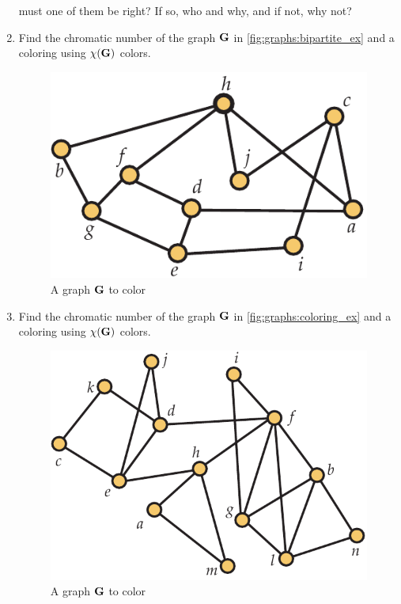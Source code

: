 \begin{enumerate}
  must one of them be right? If so, who and why, and if not, why not?
\item Find the chromatic number of the graph $\mathbf{G}$ in
  \autoref{fig:graphs:bipartite_ex} and a coloring using $\chi(\mathbf{G})$ colors.
  \begin{figure}[h]
    \centering
    \includegraphics[scale=0.6]{graphs-figs/bipartite_ex}
    \caption{A graph $\mathbf{G}$ to color}
    \label{fig:graphs:bipartite_ex}
  \end{figure}
\item Find the chromatic number of the graph $\mathbf{G}$ in
  \autoref{fig:graphs:coloring_ex} and a coloring using $\chi(\mathbf{G})$ colors.
  \begin{figure}[h]
    \centering
    \includegraphics[scale=0.6]{graphs-figs/coloring_ex}
    \caption{A graph $\mathbf{G}$ to color}
    \label{fig:graphs:coloring_ex}
  \end{figure}

\end{enumerate}
